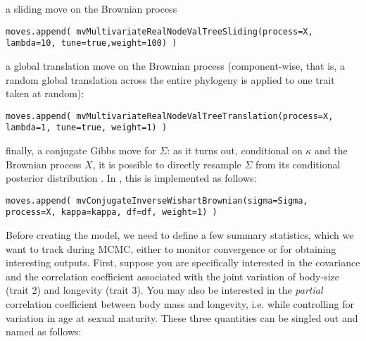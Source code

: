 a sliding move on the Brownian process
{\tt \small \begin{snugshade*}
\begin{lstlisting}
moves.append( mvMultivariateRealNodeValTreeSliding(process=X, lambda=10, tune=true,weight=100) )
\end{lstlisting}
\end{snugshade*}}
a global translation move on the Brownian process (component-wise, that is, a random global translation across the entire phylogeny is applied to one trait taken at random):
{\tt \small \begin{snugshade*}
\begin{lstlisting}
moves.append( mvMultivariateRealNodeValTreeTranslation(process=X, lambda=1, tune=true, weight=1) )
\end{lstlisting}
\end{snugshade*}}
finally, a conjugate Gibbs move for $\Sigma$: as it turns out, conditional on $\kappa$ and the Brownian process $X$, it is possible to directly resample $\Sigma$ from its conditional posterior distribution \citep{Lartillot2011}. In \RevBayes, this is implemented as follows:
{\tt \small \begin{snugshade*}
\begin{lstlisting}
moves.append( mvConjugateInverseWishartBrownian(sigma=Sigma, process=X, kappa=kappa, df=df, weight=1) )
\end{lstlisting}
\end{snugshade*}}

Before creating the model, we need to define a few summary statistics, which we want to track during MCMC, either to monitor convergence or for obtaining interesting outputs.
First, suppose you are specifically interested in the covariance and the correlation coefficient associated with the joint variation of body-size (trait 2) and longevity (trait 3). You may also be interested in the \emph{partial} correlation coefficient between body mass and longevity, i.e. while controlling for variation in age at sexual maturity. These three quantities can be singled out and named as follows:


